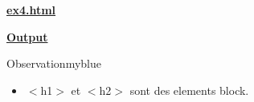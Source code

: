 \newpage
{}


\textbf{\underline{ex4.html}}
\vspace{0.1cm}



\vspace{1.5cm}

\textbf{\underline{Output}}

\vspace{0.1cm}
\begin{center}
\setlength{\fboxrule}{2pt} %
\end{center}

\begin{center}
\setlength{\fboxrule}{2pt} %
\end{center}



\vspace{1cm}

\begin{prettyBox}{Observation}{myblue}
    \begin{itemize}
        \item \(<\)h1\(>\) et \(<\)h2\(>\) sont des elements block.
    \end{itemize}
\end{prettyBox}
